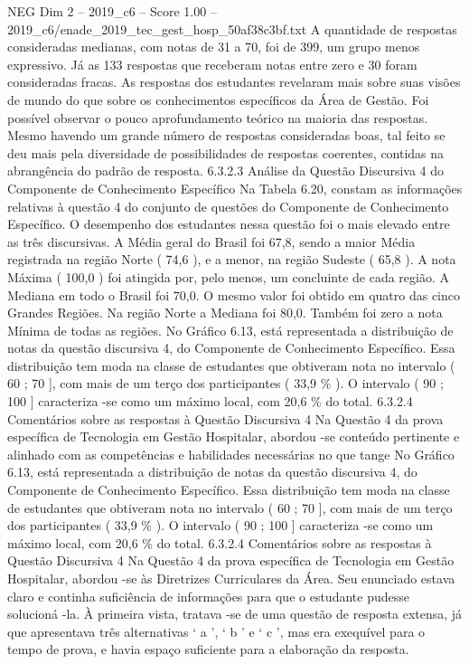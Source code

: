 \begin{textsample}{NEG Dim 2 – 2019\_c6 – Score 1.00 – 2019\_c6/enade\_2019\_tec\_gest\_hosp\_50af38c3bf.txt}
A quantidade de respostas consideradas medianas, com notas de 31 a 70, foi de 399, um grupo menos expressivo.
Já as 133 respostas que receberam notas entre zero e 30 foram consideradas fracas.
As respostas dos estudantes revelaram mais sobre suas visões de mundo do que sobre os conhecimentos específicos da Área de Gestão.
Foi possível observar o pouco aprofundamento teórico na maioria das respostas.
Mesmo havendo um grande número de respostas consideradas boas, tal feito se deu mais pela diversidade de possibilidades de respostas coerentes, contidas na abrangência do padrão de resposta. 6.3.2.3 Análise da Questão Discursiva 4 do Componente de Conhecimento Específico Na Tabela 6.20, constam as informações relativas à questão 4 do conjunto de questões do Componente de Conhecimento Específico.
O desempenho dos estudantes nessa questão foi o mais elevado entre as três discursivas.
A Média geral do Brasil foi 67,8, sendo a maior Média registrada na região Norte ( 74,6 ), e a menor, na região Sudeste ( 65,8 ).
A nota Máxima ( 100,0 ) foi atingida por, pelo menos, um concluinte de cada região.
A Mediana em todo o Brasil foi 70,0.
O mesmo valor foi obtido em quatro das cinco Grandes Regiões.
Na região Norte a Mediana foi 80,0.
Também foi zero a nota Mínima de todas as regiões.
No Gráfico 6.13, está representada a distribuição de notas da questão discursiva 4, do Componente de Conhecimento Específico.
Essa distribuição tem moda na classe de estudantes que obtiveram nota no intervalo ( 60 ; 70 ], com mais de um terço dos participantes ( 33,9 \% ).
O intervalo ( 90 ; 100 ] caracteriza -se como um máximo local, com 20,6 \% do total. 6.3.2.4 Comentários sobre as respostas à Questão Discursiva 4 Na Questão 4 da prova específica de Tecnologia em Gestão Hospitalar, abordou -se conteúdo pertinente e alinhado com as competências e habilidades necessárias no que tange No Gráfico 6.13, está representada a distribuição de notas da questão discursiva 4, do Componente de Conhecimento Específico.
Essa distribuição tem moda na classe de estudantes que obtiveram nota no intervalo ( 60 ; 70 ], com mais de um terço dos participantes ( 33,9 \% ).
O intervalo ( 90 ; 100 ] caracteriza -se como um máximo local, com 20,6 \% do total. 6.3.2.4 Comentários sobre as respostas à Questão Discursiva 4 Na Questão 4 da prova específica de Tecnologia em Gestão Hospitalar, abordou -se às Diretrizes Curriculares da Área.
Seu enunciado estava claro e continha suficiência de informações para que o estudante pudesse solucioná -la.
À primeira vista, tratava -se de uma questão de resposta extensa, já que apresentava três alternativas ‘ a ’, ‘ b ’ e ‘ c ’, mas era exequível para o tempo de prova, e havia espaço suficiente para a elaboração da resposta.

\end{textsample}

